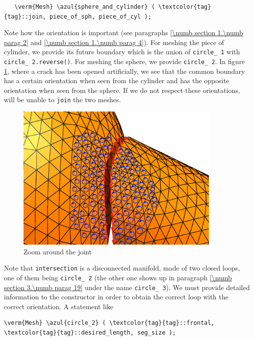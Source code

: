 \begin{Verbatim}
   \verm{Mesh} \azul{sphere_and_cylinder} ( \textcolor{tag}{tag}::join, piece_of_sph, piece_of_cyl );
\end{Verbatim}

Note how the orientation is important (see paragraphs \ref{\numb section 1.\numb parag 2}
and \ref{\numb section 1.\numb parag 4}).
For meshing the piece of cylinder, we provide its future boundary which is the union of
{\small\tt circle\_\,1} with {\small\tt circle\_\,2.reverse()}.
For meshing the sphere, we provide {\small\tt circle\_\,2}.
In figure \ref{\numb section 3.\numb fig 6}, where a crack has been opened artificially,
we see that the common boundary has a certain orientation when seen from the cylinder and
has the opposite orientation when seen from the sphere.
If we do not respect these orientations, {\maniFEM} will be unable to {\small\tt join} the two
meshes.

\begin{figure}[ht] \centering
 \includegraphics[width=100mm]{crack}
  \caption{Zoom around the joint}
  \label{\numb section 3.\numb fig 6}
\end{figure}

Note that {\small\tt intersection} is a disconnected manifold, made of two closed loops,
one of them being {\small\tt circle\_\,2} (the other one shows up in
paragraph \ref{\numb section 3.\numb parag 19} under the name {\small\tt circle\_\,3}).
We must provide detailed information to the {\small\tt{}} constructor in order to
obtain the correct loop with the correct orientation.
A statement like

\begin{Verbatim}[commandchars=\\\{\},formatcom=\small\tt,
   baselinestretch=0.94,framesep=2mm                     ]
   \verm{Mesh} \azul{circle_2} ( \textcolor{tag}{tag}::frontal, \textcolor{tag}{tag}::desired_length, seg_size );
\end{Verbatim}

